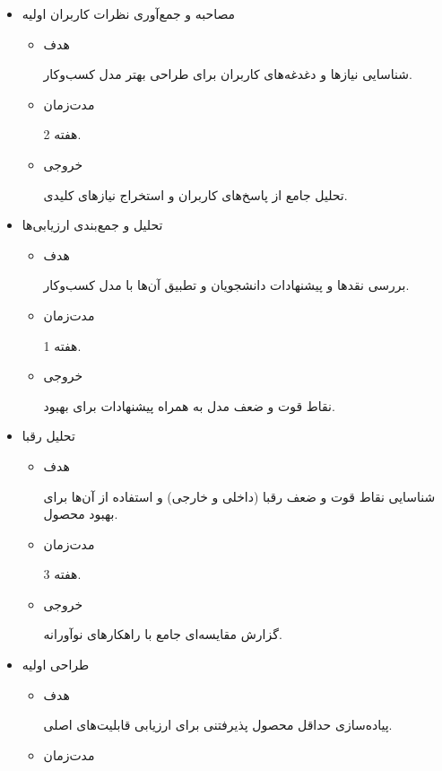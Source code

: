 \documentclass[dvipsnames, svgnames, x11names, 11pt]{article}
\begin{document}
\begin{itemize}
\item 
مصاحبه و جمع‌آوری نظرات کاربران اولیه
\begin{itemize}
\item 
هدف

شناسایی نیازها و دغدغه‌های کاربران برای طراحی بهتر مدل کسب‌وکار.

\item 
مدت‌زمان

2 هفته.

\item 
خروجی

تحلیل جامع از پاسخ‌های کاربران و استخراج نیازهای کلیدی.
\end{itemize}

\item 
تحلیل و جمع‌بندی ارزیابی‌ها
\begin{itemize}
\item 
هدف

بررسی نقدها و پیشنهادات دانشجویان و تطبیق آن‌ها با مدل کسب‌وکار.

\item 
مدت‌زمان

1 هفته.

\item 
خروجی

نقاط قوت و ضعف مدل به همراه پیشنهادات برای بهبود.
\end{itemize}

\item 
تحلیل رقبا
\begin{itemize}
\item 
هدف

شناسایی نقاط قوت و ضعف رقبا (داخلی و خارجی) و استفاده از آن‌ها برای بهبود محصول.

\item 
مدت‌زمان

3 هفته.

\item 
خروجی

گزارش مقایسه‌ای جامع با راهکارهای نوآورانه.
\end{itemize}

\item 
طراحی اولیه 
\begin{itemize}
\item 
هدف

پیاده‌سازی حداقل محصول پذیرفتنی  برای ارزیابی قابلیت‌های اصلی.

\item 
مدت‌زمان


\end{itemize}
\end{itemize}
\end{document}
